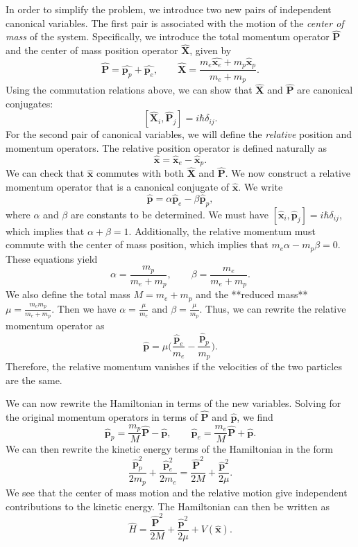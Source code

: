 In order to simplify the problem, we introduce two new pairs of independent canonical variables. The first pair is associated with the motion of the \textit{center of mass} of the system. Specifically, we introduce the total momentum operator $\hat{\mathbf{P}}$ and the center of mass position operator $\hat{\mathbf{X}}$, given by $$\hat{\mathbf{P}}=\hat{\mathbf{p}_p}+\hat{\mathbf{p}_e},\quad\quad\hat{\mathbf{X}}=\frac{m_e\hat{\mathbf{x}_e}+m_p\hat{\mathbf{x}}_p}{m_e+m_p}.$$Using the commutation relations above, we can show that $\hat{\mathbf{X}}$ and $\hat{\mathbf{P}}$ are canonical conjugates: $$[\hat{\mathbf{X}}_i,\hat{\mathbf{P}}_j]=i\hbar\delta_{ij}.$$For the second pair of canonical variables, we will define the \textit{relative} position and momentum operators. The relative position operator is defined naturally as $$\hat{\mathbf{x}}=\hat{\mathbf{x}}_e-\hat{\mathbf{x}}_p.$$We can check that $\hat{\mathbf{x}}$ commutes with both $\hat{\mathbf{X}}$ and $\hat{\mathbf{P}}$. We now construct a relative momentum operator that is a canonical conjugate of $\hat{\mathbf{x}}$. We write $$\hat{\mathbf{p}}=\alpha\hat{\mathbf{p}}_e-\beta\hat{\mathbf{p}}_p,$$where $\alpha$ and $\beta$ are constants to be determined. We must have $[\hat{\mathbf{x}}_i,\hat{\mathbf{p}}_j]=i\hbar\delta_{ij}$, which implies that $\alpha+\beta=1$. Additionally, the relative momentum must commute with the center of mass position, which implies that $m_e\alpha-m_p\beta=0$. These equations yield $$\alpha=\frac{m_p}{m_e+m_p},\qquad \beta=\frac{m_e}{m_e+m_p}.$$We also define the total mass $M=m_e+m_p$ and the **reduced mass** $\mu=\frac{m_em_p}{m_e+m_p}$. Then we have $\alpha=\frac{\mu}{m_e}$ and $\beta=\frac{\mu}{m_p}$. Thus, we can rewrite the relative momentum operator as $$\hat{\mathbf{p}}=\mu\bigg(\frac{\hat{\mathbf{p}}_e}{m_e}-\frac{\hat{\mathbf{p}}_p}{m_p}\bigg).$$Therefore, the relative momentum vanishes if the velocities of the two particles are the same.

We can now rewrite the Hamiltonian in terms of the new variables. Solving for the original momentum operators in terms of $\hat{\mathbf{P}}$ and $\hat{\mathbf{p}}$, we find $$\hat{\mathbf{p}}_p=\frac{m_p}{M}\hat{\mathbf{P}}-\hat{\mathbf{p}},\qquad\hat{\mathbf{p}}_e=\frac{m_e}{M}\hat{\mathbf{P}}+\hat{\mathbf{p}}.$$We can then rewrite the kinetic energy terms of the Hamiltonian in the form $$\frac{\hat{\mathbf{p}}_p^2}{2m_p}+\frac{\hat{\mathbf{p}}_e^2}{2m_e}=\frac{\hat{\mathbf{P}}^2}{2M}+\frac{\hat{\mathbf{p}}^2}{2\mu}.$$We see that the center of mass motion and the relative motion give independent contributions to the kinetic energy. The Hamiltonian can then be written as $$\hat{H}=\frac{\hat{\mathbf{P}}^2}{2M}+\frac{\hat{\mathbf{p}}^2}{2\mu}+V(\hat{\mathbf{x}}).$$

